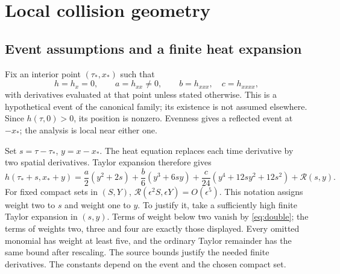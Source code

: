 \section{Local collision geometry}\label{sec:double}

\subsection{Event assumptions and a finite heat expansion}
Fix an interior point \((\tau_*,x_*)\) such that
\begin{equation}\label{eq:double}
 h=h_x=0,\qquad a=h_{xx}\ne0,
 \qquad b=h_{xxx},\quad c=h_{xxxx},
\end{equation}
with derivatives evaluated at that point unless stated otherwise.
This is a hypothetical event of the canonical family; its existence is
not assumed elsewhere. Since \(h(\tau,0)>0\), its position is nonzero.
Evenness gives a reflected event at \(-x_*\); the analysis is local
near either one.

Set \(s=\tau-\tau_*\), \(y=x-x_*\).
The heat equation replaces each time derivative by two spatial
derivatives. Taylor expansion therefore gives
\begin{equation}\label{eq:heat-four-jet}
 h(\tau_*+s,x_*+y)
 =\frac a2(y^2+2s)+\frac b6(y^3+6sy)
  +\frac c{24}(y^4+12sy^2+12s^2)+\mathcal R(s,y).
\end{equation}
For fixed compact sets in \((S,Y)\),
\(\mathcal R(\epsilon^2S,\epsilon Y)=O(\epsilon^5)\).
This notation assigns weight two to \(s\) and weight one to \(y\).
To justify it, take a sufficiently high finite Taylor expansion in
\((s,y)\). Terms of weight below two vanish by \eqref{eq:double};
the terms of weights two, three and four are exactly those displayed.
Every omitted monomial has weight at least five, and the ordinary
Taylor remainder has the same bound after rescaling. The source bounds
justify the needed finite derivatives. The constants depend on the event
and the chosen compact set.

